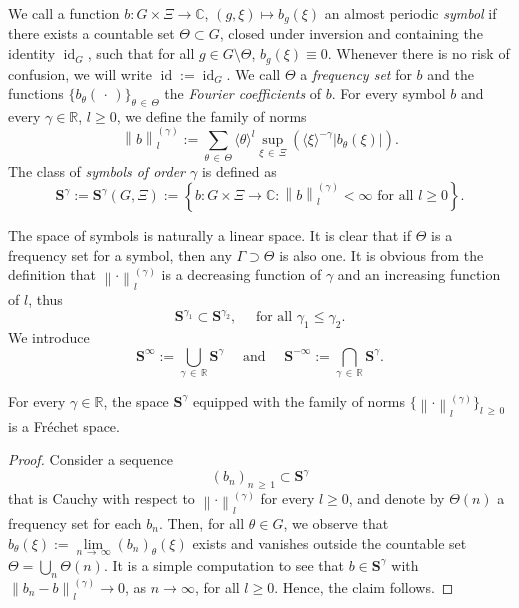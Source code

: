 \documentclass[AHL,Unicode,longabstracts,published]{cedram}
\DeclareMathOperator{\id}{id}
\newcommand{\R}{\mathbb R}
\newcommand{\C}{\mathbb C}
\newcommand{\BS}{\mathbf S}
\renewcommand{\subseteq}{\subset}
\newcommand{\set}[1]{\left\{ #1 \right\}}
\newcommand{\snorm}[3]{\left\| #1\right\|_{#3}^{(#2)}}
\newcommand{\ang}[1]{\langle #1 \rangle}
\begin{document}
\begin{defi}
We call a function $b : G \times \Xi \to \C$, $(g,\xi) \mapsto b_g(\xi)$ an almost periodic
\emph{symbol} if there exists a countable set $\Theta \subset G$, closed under inversion and containing the identity $\id_G$, such that for all $g \in G \setminus
\Theta$, $b_g(\xi) \equiv 0$. Whenever there is no risk of confusion, we will write $\id := \id_G$. We call $\Theta$ a \emph{frequency set} for $b$ and the functions $\{b_\theta(\,\cdot\,)\}_{\theta\,\in\,\Theta}$ the \emph{Fourier coefficients} of $b$. For every symbol $b$ and every $\gamma\in\R$, $l\geq 0$, we define the family of norms
\begin{equation}\label{eq:defsnorm}
\snorm{b}{\gamma}{l} := \sum_{\theta\,\in\, \Theta} \ang \theta^l
\sup_{\xi\,\in\,\Xi} \left(\ang{\xi}^{-\gamma}
\left|b_\theta(\xi)\right|\right).
\end{equation}
The class of \emph{symbols of order $\gamma$} is defined as
\begin{equation}\label{eq:sgamma}
\BS^{\gamma}:=\BS^{\gamma}(G,\Xi):=\set{ b:G\times\Xi\to\C :
\snorm{b}{\gamma}{l}<\infty \text{ for all } l\geq 0}.
\end{equation}
\end{defi}

The space of symbols is naturally a linear space. It is clear that if $\Theta$ is a frequency set for a symbol, then any $\Gamma \supset \Theta$ is also one. It is obvious from the definition that $\snorm{\cdot}{\gamma}{l}$ is a decreasing function of $\gamma$ and an increasing function of $l$, thus
\begin{equation}
\BS^{\gamma_1}\subseteq\BS^{\gamma_2},\quad \text{ for all }\gamma_1\leq \gamma_2.
\end{equation}
We introduce
\begin{equation}\label{eq:algebradef}
\BS^\infty:= \bigcup_{\gamma\, \in\,\R} \BS^\gamma \quad \text{ and }
\quad \BS^{-\infty}:= \bigcap_{\gamma\,\in \,\R} \BS^\gamma.
\end{equation}

\begin{lemm}\label{lem:complete}
For every $\gamma\in\R$, the space $\BS^\gamma$ equipped with the family of norms $\lbrace\snorm{\cdot}{\gamma}{l}\rbrace_{l\,\geq\,0}$ is a Fréchet space.
\end{lemm}


\begin{proof}
Consider a sequence
\begin{equation}
(b_n)_{n\,\geq\,1}\subset \BS^\gamma
\end{equation}
that is Cauchy with respect to $\snorm{\cdot}{\gamma}{l}$ for every $l \geq 0$, and denote by $\Theta(n)$ a frequency set for each $b_n$. Then, for all $\theta \in G$, we observe that $b_\theta(\xi):=\lim\limits_{n\,\to\,\infty}(b_n)_\theta(\xi)$ exists and vanishes outside the countable set $\Theta = \bigcup_n \Theta(n)$. It is a simple computation to see that $b\in\BS^\gamma$ with $\snorm{b_n-b}{\gamma}{l}\to 0$, as $n\to\infty$, for all $l\geq 0$. Hence, the claim follows.
\end{proof}
\end{document}
